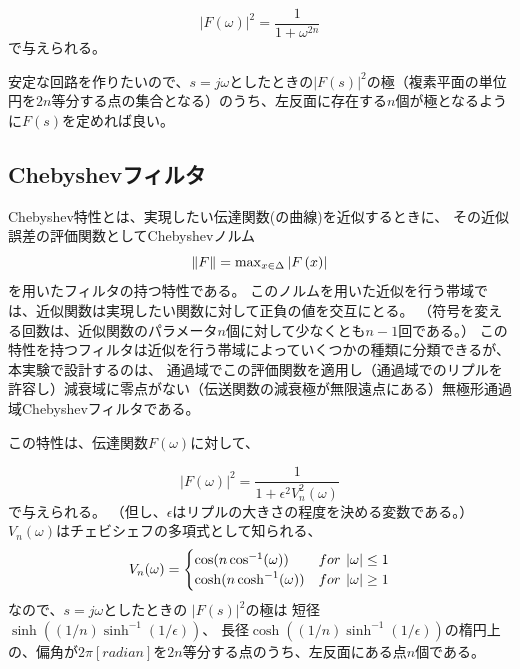 \documentclass[10pt,a4j,dvipdfmx]{jsarticle}
\makeatletter
\let\@oldsubsec\subsection
\renewcommand{\subsection}[1]{\vspace{-7pt}\@oldsubsec{#1}}
\makeatother
\begin{document}
\begin{equation}
|F(\omega)|^{2} = \frac{1}{1+\omega^{2n}}
\end{equation}
で与えられる。

安定な回路を作りたいので、$s = j\omega$としたときの$|F(s)|^{2}$の極（複素平面の単位円を$2n$等分する点の集合となる）のうち、左反面に存在する$n$個が極となるように$F(s)$を定めれば良い。

\subsection{Chebyshevフィルタ}
Chebyshev特性とは、実現したい伝達関数(の曲線)を近似するときに、
その近似誤差の評価関数としてChebyshevノルム
\begin{equation}
\|F\| = {\rm max}_{x \in \Delta} \left|F\left( x \right)\right|
\end{equation}
を用いたフィルタの持つ特性である。
このノルムを用いた近似を行う帯域では、近似関数は実現したい関数に対して正負の値を交互にとる。
（符号を変える回数は、近似関数のパラメータ$n$個に対して少なくとも$n-1$回である。）
この特性を持つフィルタは近似を行う帯域によっていくつかの種類に分類できるが、
本実験で設計するのは、
通過域でこの評価関数を適用し（通過域でのリプルを許容し）減衰域に零点がない（伝送関数の減衰極が無限遠点にある）無極形通過域Chebyshevフィルタである。

この特性は、伝達関数$F(\omega)$に対して、

\begin{equation}
|F(\omega)|^{2} = \frac{1}{1+\epsilon^{2}V_{n}^{2}(\omega)}
\end{equation}
で与えられる。
（但し、$\epsilon$はリプルの大きさの程度を決める変数である。）	
$V_{n}(\omega)$はチェビシェフの多項式として知られる、
\begin{equation}
  V_{n}(\omega) = 
  \begin{cases}
    \cos(n\cos^{-1} (\omega)) & {\rm} for\hspace{4pt}|\omega|\leq 1 \\
    \cosh(n \cosh^{-1} (\omega)) & {\rm}  for\hspace{4pt}|\omega|\geq 1
  \end{cases}
\end{equation}
なので、$s = j\omega$としたときの
$|F(s)|^{2}$の極は
短径$\sinh\left( (1/n)\sinh^{-1}(1/\epsilon)\right) $、
長径$\cosh\left( (1/n)\sinh^{-1}(1/\epsilon)\right) $の楕円上の、偏角が$2\pi[\si{radian}]$を$2n$等分する点のうち、左反面にある点$n$個である。
\clearpage
\end{document}

